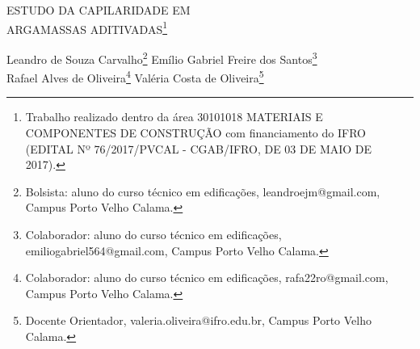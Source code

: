 \documentclass[article,12pt,onesidea,4paper,english,brazil]{abntex2}
\begin{document}
	
	
	\frenchspacing 
	
	\begin{center}
		\LARGE ESTUDO DA CAPILARIDADE EM \\ARGAMASSAS ADITIVADAS\footnote{Trabalho realizado dentro da área 30101018 MATERIAIS E COMPONENTES DE CONSTRUÇÃO
			com financiamento do IFRO (EDITAL Nº 76/2017/PVCAL - CGAB/IFRO, DE 03 DE MAIO DE 2017).}
		
		\normalsize
	Leandro de Souza Carvalho\footnote{Bolsista: aluno do curso técnico em edificações, leandroejm@gmail.com, Campus Porto Velho Calama.} 
	Emílio Gabriel Freire dos Santos\footnote{Colaborador: aluno do curso técnico em edificações, emiliogabriel564@gmail.com, Campus Porto Velho Calama.} \\
	Rafael Alves de Oliveira\footnote{Colaborador: aluno do curso técnico em edificações, rafa22ro@gmail.com, Campus Porto Velho Calama.} 
	Valéria Costa de Oliveira\footnote{Docente Orientador, valeria.oliveira@ifro.edu.br, Campus Porto Velho Calama.} 
	\end{center}
	
\end{document}
